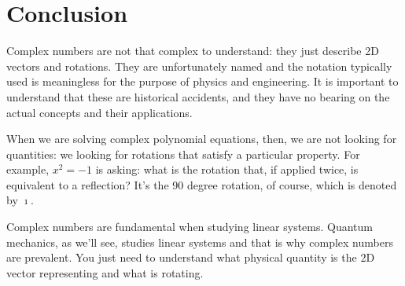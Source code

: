 \documentclass[aps,pra,10pt,floatfix,nofootinbib]{revtex4-1}
\theoremstyle{definition}
\begin{document}
\section{Conclusion}

Complex numbers are not that complex to understand: they just describe 2D vectors and rotations. They are unfortunately named and the notation typically used is meaningless for the purpose of physics and engineering. It is important to understand that these are historical accidents, and they have no bearing on the actual concepts and their applications.

When we are solving complex polynomial equations, then, we are not looking for quantities: we looking for rotations that satisfy a particular property. For example, $x^2=-1$ is asking: what is the rotation that, if applied twice, is equivalent to a reflection? It's the 90 degree rotation, of course, which is denoted by $\imath$.

Complex numbers are fundamental when studying linear systems. Quantum mechanics, as we'll see, studies linear systems and that is why complex numbers are prevalent. You just need to understand what physical quantity is the 2D vector representing and what is rotating.
\end{document}
